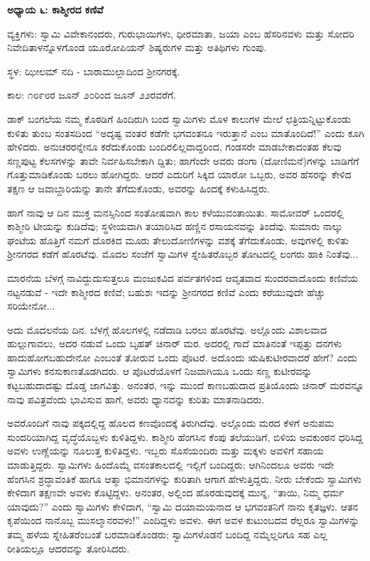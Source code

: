 \textbf{ಅಧ್ಯಾಯ ೬: ಕಾಶ್ಮೀರದ ಕಣಿವೆ}

ವ್ಯಕ್ತಿಗಳು: ಸ್ವಾಮಿ ವಿವೇಕಾನಂದರು, ಗುರುಭಾಯಿಗಳು, ಧೀರಮಾತಾ, ಜಯಾ ಎಂಬ ಹೆಸರಿನವಳು ಮತ್ತು ಸೋದರಿ ನಿವೇದಿತಾಳನ್ನೊಳಗೊಂಡ ಯೂರೋಪಿಯನ್ ಶಿಷ್ಯರುಗಳ ಮತ್ತು ಅತಿಥಿಗಳು ಗುಂಪು.

ಸ್ಥಳ: ಝೀಲಮ್​ ನದಿ - ಬಾರಾಮುಲ್ಲಾದಿಂದ ಶ‍್ರೀನಗರಕ್ಕೆ.

ಕಾಲ: ೧೮೯೮ರ ಜೂನ್ ೨೦ರಿಂದ ಜೂನ್ ೨೨ರವರೆಗೆ.

ಡಾಕ್ ಬಂಗಲೆಯ ನಮ್ಮ ಕೊಠಡಿಗೆ ಹಿಂದಿರುಗಿ ಬಂದ ಸ್ವಾಮಿಗಳು ಮೊಳ ಕಾಲುಗಳ ಮೇಲೆ ಛತ್ರಿಯನ್ನಿಟ್ಟುಕೊಂಡು ಕುಳಿತು ತುಂಬ ಸಂತಸದಿಂದ “ಅದೃಷ್ಟ ವಂತರ ಕಡೆಗೇ ಭಗವಂತನೂ ಇರುತ್ತಾನೆ ಎಂಬ ಮಾತೊಂದಿದೆ!” ಎಂದು ಕೂಗಿ ಹೇಳಿದರು. ಅನುಚರರನ್ನೇನೂ ಕರೆದುಕೊಂಡು ಬಂದಿರಲಿಲ್ಲವಾದ್ದರಿಂದ, ಗಂಡಸರೇ ಮಾಡಬೇಕಾದಂತಹ ಕೆಲವು ಸಣ್ಣಪುಟ್ಟ ಕೆಲಸಗಳನ್ನು ತಾವೇ ನಿರ್ವಹಿಸಬೇಕಾಗಿ ದ್ದಿತು; ಹಾಗೆಂದೇ ಅವರು ಡಂಗಾ (ದೋಣಿಮನೆ)ಗಳನ್ನು ಬಾಡಿಗೆಗೆ ಗೊತ್ತುಮಾಡಿಕೊಂಡು ಬರಲು ಹೋಗಿದ್ದರು. ಆದರೆ ಎದುರಿಗೆ ಸಿಕ್ಕಿದ ಯಾರೋ ಒಬ್ಬರು, ಅವರ ಹೆಸರನ್ನು ಕೇಳಿದ ತಕ್ಷಣ ಆ ಜವಾಬ್ದಾರಿಯನ್ನು ತಾನೇ ತೆಗೆದುಕೊಂಡು, ಅವರನ್ನು ಹಿಂದಕ್ಕೆ ಕಳುಹಿಸಿದ್ದರು.

ಹಾಗೆ ನಾವು ಆ ದಿನ ಮುಕ್ತ ಮನಸ್ಸಿನಿಂದ ಸಂತೋಷವಾಗಿ ಕಾಲ ಕಳೆಯುವಂತಾಯಿತು. ಸಾಮೋವರ್ ಒಂದರಲ್ಲಿ ಕಾಶ್ಮೀರಿ ಟೀಯನ್ನು ಕುಡಿದೆವು; ಸ್ಥಳೀಯವಾಗಿ ತಯಾರಿಸಿದ ಹಣ್ಣಿನ ರಸಾಯನವನ್ನು ತಿಂದೆವು. ಸುಮಾರು ನಾಲ್ಕು ಘಂಟೆಯ ಹೊತ್ತಿಗೆ ನಮಗೆ ದೊರಕಿದ ಮೂರು ತೇಲುದೋಣಿಗಳನ್ನು ವಶಕ್ಕೆ ತೆಗೆದುಕೊಂಡು, ಅವುಗಳಲ್ಲಿ ಕುಳಿತು ಶ‍್ರೀನಗರದ ಕಡೆಗೆ ಹೊರಟೆವು. ಮೊದಲ ಸಂಜೆಗೆ ಸ್ವಾಮಿಗಳ ಸ್ನೇಹಿತರೊಬ್ಬರ ತೋಟದಲ್ಲಿ ಲಂಗರು ಹಾಕಿ ನಿಂತೆವು...

ಮಾರನೆಯ ಬೆಳಗ್ಗೆ ನಾವಿದ್ದುದುಸುತ್ತಲೂ ಮಂಜುಕವಿದ ಪರ್ವತಗಳಿಂದ ಆವೃತವಾದ ಸುಂದರವಾದೊಂದು ಕಣಿವೆಯ ನಟ್ಟನಡುವೆ - ಇದೇ ಕಾಶ್ಮೀರದ ಕಣಿವೆ; ಬಹುಶಃ ಇದನ್ನು ಶ‍್ರೀನಗರದ ಕಣಿವೆ ಎಂದು ಕರೆಯುವುದೇ ಹೆಚ್ಚು ಸರಿಯೇನೋ...

ಅದು ಮೊದಲನೆಯ ದಿನ. ಬೆಳಗ್ಗೆ ಹೊಲಗಳಲ್ಲಿ ನಡೆದಾಡಿ ಬರಲು ಹೊರಟೆವು. ಅಲ್ಲೊಂದು ವಿಶಾಲವಾದ ಹುಲ್ಲುಗಾವಲು, ಅದರ ನಡುವೆ ಒಂದು ಬೃಹತ್ ಚಿನಾರ್ ಮರ. ಅದರಲ್ಲಿ ಗಾದೆ ಮಾತಿನಂತೆ ಇಪ್ಪತ್ತು ದನಗಳು ಹಾದುಹೋಗಬಹುದೇನೋ ಎಂಬಂತೆ ತೋರುವ ಒಂದು ಪೊಟರೆ. ಅದೊಂದು ಋಷಿಕುಟೀರವಾದರೆ ಹೇಗೆ? ಎಂದು ಸ್ವಾಮಿಗಳು ಕನಸುಕಾಣತೊಡಗಿದರು. ಆ ಪೊಟರೆಯೊಳಗೆ ನಿಜವಾಗಿಯೂ ಒಂದು ಸಣ್ಣ ಕುಟೀರವನ್ನು ಕಟ್ಟಬಹುದಾದಷ್ಟು ದೊಡ್ಡ ಜಾಗವಿತ್ತು. ಅನಂತರ, ಇನ್ನು ಮುಂದೆ ಕಾಣಬಹುದಾದ ಪ್ರತಿಯೊಂದು ಚಿನಾರ್ ಮರವನ್ನೂ ನಾವು ಪವಿತ್ರವೆಂದು ಭಾವಿಸುವ ಹಾಗೆ, ಅವರು ಧ್ಯಾನವನ್ನು ಕುರಿತು ಮಾತನಾಡಿದರು.

ಅವರೊಂದಿಗೆ ನಾವು ಪಕ್ಕದಲ್ಲಿದ್ದ ಹೊಲದ ಕಣವೊಂದಕ್ಕೆ ತಿರುಗಿದೆವು. ಅಲ್ಲೊಂದು ಮರದ ಕೆಳಗೆ ಅನುಪಮ ಸುಂದರಿಯಾಗಿದ್ದ ವೃದ್ಧೆಯೊಬ್ಬಳು ಕುಳಿತಿದ್ದಳು. ಕಾಶ್ಮೀರಿ ಹೆಂಗಸಿನ ಕೆಂಪು ತಲೆಯುಡಿಗೆ, ಬಿಳಿಯ ಅವಕುಂಠನ ಧರಿಸಿದ್ದ ಅವಳು ಉಣ್ಣೆಯನ್ನು ನೂಲುತ್ತ ಕುಳಿತಿದ್ದಳು. ಇಬ್ಬರು ಸೊಸೆಯಂದಿರು ಮತ್ತು ಮಕ್ಕಳು ಅವಳಿಗೆ ಸಹಾಯ ಮಾಡುತ್ತಿದ್ದರು. ಸ್ವಾಮಿಗಳು ಹಿಂದೊಮ್ಮೆ ವಸಂತಕಾಲದಲ್ಲಿ ಇಲ್ಲಿಗೆ ಬಂದಿದ್ದರು; ಆಗಿನಿಂದಲೂ ಅವರು ಇದೇ ಹೆಂಗಸಿನ ಶ್ರದ್ಧಾವಂತಿಕೆ ಹಾಗೂ ಆತ್ಮಾ ಭಿಮಾನಗಳನ್ನು ಕುರಿತಾಗಿ ಆಗಾಗ ಹೇಳುತ್ತಿದ್ದರು. ನೀರು ಬೇಕೆಂದು ಸ್ವಾಮಿಗಳು ಕೇಳಿದಾಗ ತಕ್ಷಣವೇ ಅವಳು ಕೊಟ್ಟಿದ್ದಳು. ಅನಂತರ, ಅಲ್ಲಿಂದ ಹೊರಡುವುದಕ್ಕೆ ಮುನ್ನ, “ತಾಯಿ, ನಿಮ್ಮ ಧರ್ಮ ಯಾವುದು?” ಎಂದು ಸ್ವಾಮಿಗಳು ಕೇಳಿದಾಗ, “ಸ್ವಾಮಿ ದಯಾಮಯನಾದ ಆ ಭಗವಂತನಿಗೆ ನಾನು ಕೃತಜ್ಞಳು. ಆತನ ಕೃಪೆಯಿಂದ ನಾನೊಬ್ಬ ಮುಸಲ್ಮಾನರವಳು!” ಎಂದಿದ್ದಳು ಅವಳು. ಈಗ ಅವಳ ಕುಟುಂಬದವ ರೆಲ್ಲರೂ ಸ್ವಾಮಿಗಳನ್ನು ತಮ್ಮ ಹಳೆಯ ಸ್ನೇಹಿತರೆಂಬಂತೆ ಬರಮಾಡಿಕೊಂಡರು; ಸ್ವಾಮಿಗಳೊಡನೆ ಬಂದಿದ್ದ ನಮ್ಮೆಲ್ಲರಿಗೂ ಸಹ ಎಲ್ಲ ರೀತಿಯಲ್ಲೂ ಆದರವನ್ನು ತೋರಿಸಿದರು.

